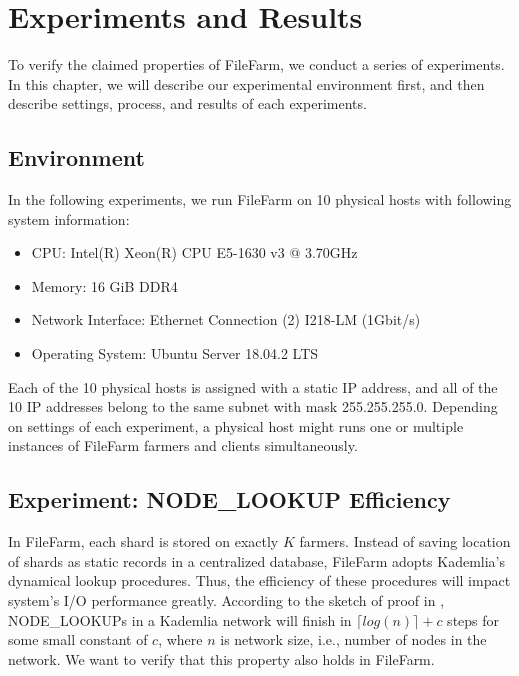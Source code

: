 \chapter{Experiments and Results}
\label{c:experiments_and_results}

To verify the claimed properties of FileFarm, we conduct a series of experiments. In this chapter, we will describe our experimental environment first, and then describe settings, process, and results of each experiments.

\section{Environment}
\label{s:expenvironment}

In the following experiments, we run FileFarm on 10 physical hosts with following system information:

\begin{itemize}
    \item CPU: Intel(R) Xeon(R) CPU E5-1630 v3 @ 3.70GHz
    \item Memory: 16 GiB DDR4
    \item Network Interface: Ethernet Connection (2) I218-LM (1Gbit/s)
    \item Operating System: Ubuntu Server 18.04.2 LTS
\end{itemize}

 \noindent Each of the 10 physical hosts is assigned with a static IP address, and all of the 10 IP addresses belong to the same subnet with mask 255.255.255.0. Depending on settings of each experiment, a physical host might runs one or multiple instances of FileFarm farmers and clients simultaneously.

\section{Experiment: NODE\_LOOKUP Efficiency}
\label{s:expnodelookupefficiency}

In FileFarm, each shard is stored on exactly $K$ farmers. Instead of saving location of shards as static records in a centralized database, FileFarm adopts Kademlia's dynamical lookup procedures. Thus, the efficiency of these procedures will impact system's I/O performance greatly. According to the sketch of proof in \cite{maymounkov2002kademlia}, NODE\_LOOKUPs in a Kademlia network will finish in $\lceil log(n) \rceil + c$ steps for some small constant of $c$, where $n$ is network size, i.e., number of nodes in the network. We want to verify that this property also holds in FileFarm.

